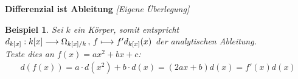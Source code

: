 \documentclass[10pt,a4paper]{report}
\newcommand{\comment}[1]{}
\newcounter{Aussage}[chapter]
\newtheorem{bsp}[Aussage]{Beispiel}
\newcommand{\function}[5]{\nolinebreak{#1:#2 \longrightarrow #3 \, , \, #4 \longmapsto #5}}
\newcommand{\divR}[2]{\Omega_{#1/#2}}
\newcommand{\divf}[1]{d_{#1}}
\begin{document}
\textbf{Differenzial ist Ableitung} \textit{[Eigene Überlegung]}
\begin{bsp}\comment{\label{Differenzial ist Ableitung}}
Sei $k$ ein Körper, somit entspricht $\function{\divf{k[x]}}{k[x]}{\divR{k[x]}{k}}{f}{f'\divf{k[x]}(x)}$ der analytischen Ableitung.\\
Teste dies an $f(x)=ax^2 + bx +c$:
\begin{gather*}
d(f(x)) = a \cdot d(x^2) + b \cdot d(x) = (2ax + b) d(x) = f'(x) d(x) 
\end{gather*}
\comment{lässt sich induktiv für Monome leicht zeigen}
\end{bsp}
\end{document}
